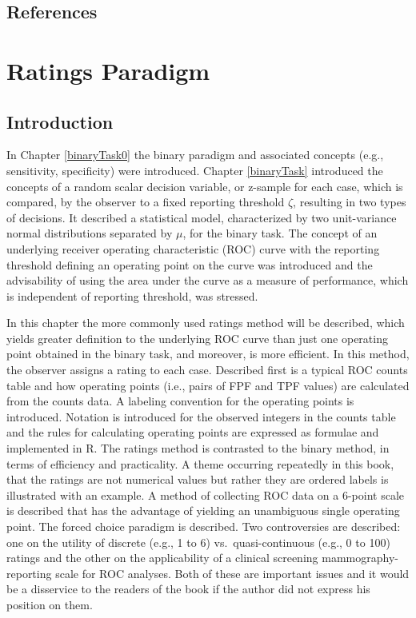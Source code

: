 \documentclass[
]{book}
\begin{document}
\hypertarget{binaryTask-references}{%
\section{References}\label{binaryTask-references}}

\hypertarget{ratingsParadigm}{%
\chapter{Ratings Paradigm}\label{ratingsParadigm}}

\hypertarget{introduction}{%
\section{Introduction}\label{introduction}}

In Chapter \ref{binaryTask0} the binary paradigm and associated concepts (e.g., sensitivity, specificity) were introduced. Chapter \ref{binaryTask} introduced the concepts of a random scalar decision variable, or z-sample for each case, which is compared, by the observer to a fixed reporting threshold \(\zeta\), resulting in two types of decisions. It described a statistical model, characterized by two unit-variance normal distributions separated by \(\mu\), for the binary task. The concept of an underlying receiver operating characteristic (ROC) curve with the reporting threshold defining an operating point on the curve was introduced and the advisability of using the area under the curve as a measure of performance, which is independent of reporting threshold, was stressed.

In this chapter the more commonly used ratings method will be described, which yields greater definition to the underlying ROC curve than just one operating point obtained in the binary task, and moreover, is more efficient. In this method, the observer assigns a rating to each case. Described first is a typical ROC counts table and how operating points (i.e., pairs of FPF and TPF values) are calculated from the counts data. A labeling convention for the operating points is introduced. Notation is introduced for the observed integers in the counts table and the rules for calculating operating points are expressed as formulae and implemented in R. The ratings method is contrasted to the binary method, in terms of efficiency and practicality. A theme occurring repeatedly in this book, that the ratings are not numerical values but rather they are ordered labels is illustrated with an example. A method of collecting ROC data on a 6-point scale is described that has the advantage of yielding an unambiguous single operating point. The forced choice paradigm is described. Two controversies are described: one on the utility of discrete (e.g., 1 to 6) vs.~quasi-continuous (e.g., 0 to 100) ratings and the other on the applicability of a clinical screening mammography-reporting scale for ROC analyses. Both of these are important issues and it would be a disservice to the readers of the book if the author did not express his position on them.
\end{document}
